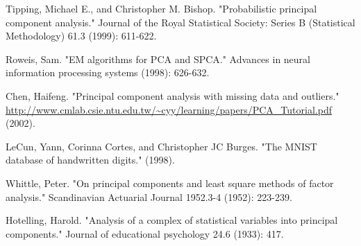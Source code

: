 \documentclass[12pt]{report}
\begin{document}
\begin{thebibliography}{1}
	Tipping, Michael E., and Christopher M. Bishop. "Probabilistic principal component analysis." Journal of the Royal Statistical Society: Series B (Statistical Methodology) 61.3 (1999): 611-622.
	
Roweis, Sam. "EM algorithms for PCA and SPCA." Advances in neural information processing systems (1998): 626-632.

Chen, Haifeng. "Principal component analysis with missing data and outliers." \url{http://www.cmlab.csie.ntu.edu.tw/~cyy/learning/papers/PCA_Tutorial.pdf} (2002).
		
LeCun, Yann, Corinna Cortes, and Christopher JC Burges. "The MNIST database of handwritten digits." (1998).	
		
Whittle, Peter. "On principal components and least square methods of factor analysis." Scandinavian Actuarial Journal 1952.3-4 (1952): 223-239.	

Hotelling, Harold. "Analysis of a complex of statistical variables into principal components." Journal of educational psychology 24.6 (1933): 417.	
		
\end{thebibliography}
\end{document}
